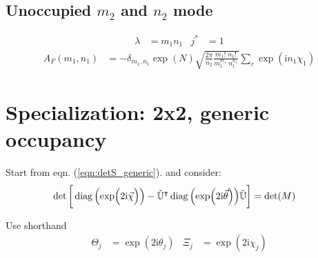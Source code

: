 \documentclass[
	english,
	a4paper,
	fontsize=10pt,
	parskip=half,
	titlepage=true,
	DIV=12,
	final
]{scrreprt}
\newcommand*{\transp}{\ensuremath{^\intercal}}
\newcommand*{\iunit}{\ensuremath{\mathrm{i}}}
\DeclareMathOperator{\diag}{diag}
\begin{document}
\subsection{Unoccupied $m_2$ and $n_2$ mode}
\begin{align}
	\lambda &= m_1 n_1
&
	j^* &= 1
\end{align}
\begin{align}
	A_F(m_1, n_1)
&=
	-\delta_{m_1,n_1}
	\exp(N)
	\sqrt{
		\frac
			{2\pi}
			{n_2}
		\frac
			{ m_1!      \; n_1! }
			{ m_1^{m_1} \; n_1^{n_1} }
	}
	\sum_r
		\exp( \iunit n_1 \chi_1 )
\end{align}

\section{Specialization: 2x2, generic occupancy}
Start from eqn. (\ref{eqn:detS_generic}). and consider:
\begin{align*}
	\det\qty[\bigg.
		\diag\qty(\exp(\Big.2\iunit\vec{\chi}))
		-
		\tilde{\mathbb{U}}\transp
		\diag\qty(\exp(2\iunit\vec{\theta}))
		\tilde{\mathbb{U}}
	]
&=
	\det(M)
\end{align*}

Use shorthand
\begin{align}
	\Theta_j &= \exp(2\iunit \theta_j)
&
	\Xi_j &= \exp(2\iunit \chi_j)
\end{align}
\end{document}
